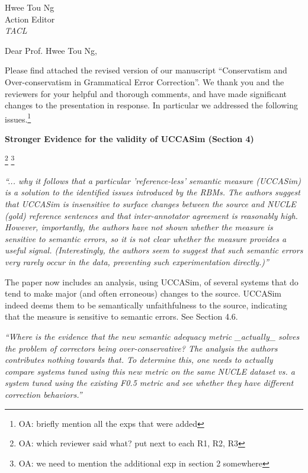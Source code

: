\documentclass[11pt,letterpaper]{letter}
\newcommand{\oa}[1]{\footnote{\color{red}OA: #1}}
\begin{document}
\begin{letter}{%
Hwee Tou Ng\\
Action Editor\\
{\em TACL}\\
}



\vspace{.5cm}

  \opening{Dear Prof. Hwee Tou Ng,}


\vspace{.5cm}
  
  Please find attached the revised version of our manuscript ``Conservatism and Over-conservatism in Grammatical Error Correction''. We thank you and the reviewers for your helpful and thorough comments, and have made significant changes to the presentation in response. In particular we addressed the following issues.\oa{briefly mention all the exps that were added}

\vspace{.5cm}

{\large\bf Stronger Evidence for the validity of UCCASim (Section 4)}

\oa{which reviewer said what? put next to each R1, R2, R3}
\oa{we need to mention the additional exp in section 2 somewhere}

\emph{``... why it follows that a
	particular 'reference-less' semantic measure (UCCASim) is a solution to the
	identified issues introduced by the RBMs. The authors suggest that UCCASim
	is insensitive to surface changes between the source and NUCLE (gold)
	reference sentences and that inter-annotator agreement is reasonably high.
	However, importantly, the authors have not shown whether the measure is
	sensitive to semantic errors, so it is not clear whether the measure
	provides a useful signal. (Interestingly, the authors seem to suggest that
	such semantic errors very rarely occur in the data, preventing such
	experimentation directly.)''
}

The paper now includes an analysis, using UCCASim, of several systems that do tend to
make major (and often erroneous) changes to the source. UCCASim indeed deems them to be semantically
unfaithfulness to the source, indicating that the measure is sensitive to semantic errors. See Section 4.6.

\emph{``Where is the evidence that the new semantic adequacy metric \_actually\_
	solves the problem of correctors being over-conservative? The analysis the
	authors contributes nothing towards that. To determine this, one needs to
	actually compare systems tuned using this new metric on the same NUCLE
	dataset vs. a system tuned using the existing F0.5 metric and see whether
	they have different correction behaviors.''
	}


\end{letter}
\end{document}
